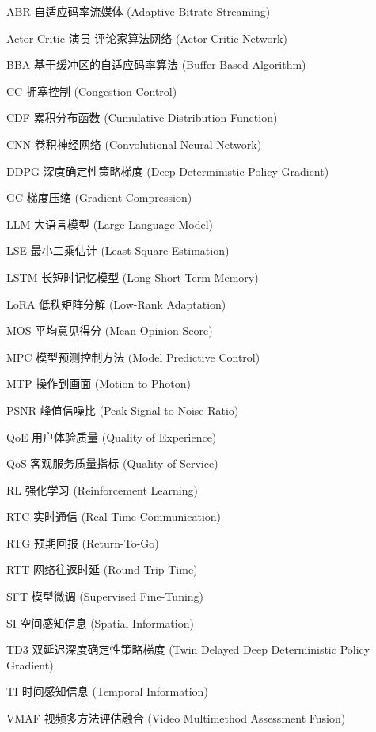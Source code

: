
\begin{denotation}[3cm]
\item[ABR] 自适应码率流媒体 (Adaptive Bitrate Streaming)
\item[Actor-Critic] 演员-评论家算法网络 (Actor-Critic Network) 
\item[BBA] 基于缓冲区的自适应码率算法 (Buffer-Based Algorithm)
\item[CC] 拥塞控制 (Congestion Control)
\item[CDF] 累积分布函数 (Cumulative Distribution Function)
\item[CNN] 卷积神经网络 (Convolutional Neural Network)
\item[DDPG] 深度确定性策略梯度 (Deep Deterministic Policy Gradient)
\item[GC] 梯度压缩 (Gradient Compression)
\item[LLM] 大语言模型 (Large Language Model)
\item[LSE] 最小二乘估计 (Least Square Estimation)
\item[LSTM] 长短时记忆模型 (Long Short-Term Memory)
\item[LoRA] 低秩矩阵分解 (Low-Rank Adaptation)
\item[MOS] 平均意见得分 (Mean Opinion Score) 
\item[MPC] 模型预测控制方法 (Model Predictive Control)
\item[MTP] 操作到画面 (Motion-to-Photon)
\item[PSNR] 峰值信噪比 (Peak Signal-to-Noise Ratio)
\item[QoE] 用户体验质量 (Quality of Experience)
\item[QoS] 客观服务质量指标 (Quality of Service) 
\item[RL] 强化学习 (Reinforcement Learning)
\item[RTC] 实时通信 (Real-Time Communication) 
\item[RTG] 预期回报 (Return-To-Go)
\item[RTT] 网络往返时延 (Round-Trip Time)
\item[SFT] 模型微调 (Supervised Fine-Tuning)
\item[SI] 空间感知信息 (Spatial Information) 
\item[TD3] 双延迟深度确定性策略梯度 (Twin Delayed Deep Deterministic Policy Gradient) 
\item[TI] 时间感知信息 (Temporal Information) 
\item[VMAF] 视频多方法评估融合 (Video Multimethod Assessment Fusion) 


\end{denotation}



